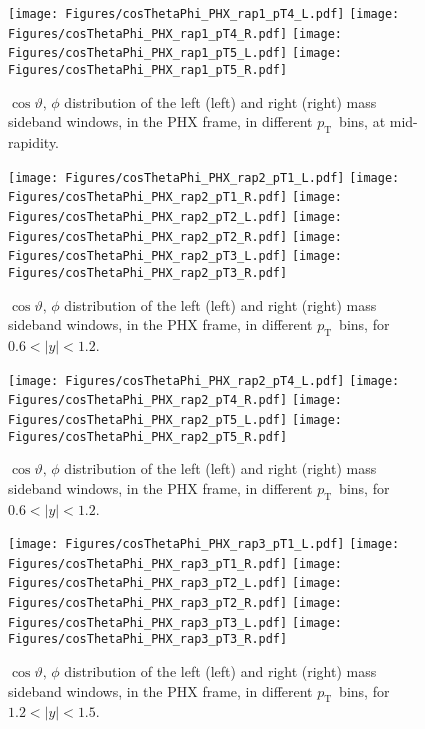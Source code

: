 \documentclass[12pt]{article}
\newcommand{\pt}{$p_{\mathrm{T}}$}
\begin{document}
\begin{figure}[htbp]
\centering
\texttt{[image: Figures/cosThetaPhi\_PHX\_rap1\_pT4\_L.pdf]}
\texttt{[image: Figures/cosThetaPhi\_PHX\_rap1\_pT4\_R.pdf]}
\texttt{[image: Figures/cosThetaPhi\_PHX\_rap1\_pT5\_L.pdf]}
\texttt{[image: Figures/cosThetaPhi\_PHX\_rap1\_pT5\_R.pdf]}
\caption{$\cos\vartheta,\,\phi$ distribution of the left (left) and
  right (right) mass sideband windows, in the PHX frame, in different
  \pt\ bins, at mid-rapidity.} 
\end{figure}
\clearpage


\begin{figure}[htbp]
\centering
\texttt{[image: Figures/cosThetaPhi\_PHX\_rap2\_pT1\_L.pdf]}
\texttt{[image: Figures/cosThetaPhi\_PHX\_rap2\_pT1\_R.pdf]}
\texttt{[image: Figures/cosThetaPhi\_PHX\_rap2\_pT2\_L.pdf]}
\texttt{[image: Figures/cosThetaPhi\_PHX\_rap2\_pT2\_R.pdf]}
\texttt{[image: Figures/cosThetaPhi\_PHX\_rap2\_pT3\_L.pdf]}
\texttt{[image: Figures/cosThetaPhi\_PHX\_rap2\_pT3\_R.pdf]}
\caption{$\cos\vartheta,\,\phi$ distribution of the left (left) and
  right (right) mass sideband windows, in the PHX frame, in different
  \pt\ bins, for $0.6 < |y| < 1.2$.}
\end{figure}
\clearpage

\begin{figure}[htbp]
\centering
\texttt{[image: Figures/cosThetaPhi\_PHX\_rap2\_pT4\_L.pdf]}
\texttt{[image: Figures/cosThetaPhi\_PHX\_rap2\_pT4\_R.pdf]}
\texttt{[image: Figures/cosThetaPhi\_PHX\_rap2\_pT5\_L.pdf]}
\texttt{[image: Figures/cosThetaPhi\_PHX\_rap2\_pT5\_R.pdf]}
\caption{$\cos\vartheta,\,\phi$ distribution of the left (left) and
  right (right) mass sideband windows, in the PHX frame, in different
  \pt\ bins, for $0.6 < |y| < 1.2$.} 
\end{figure}
\clearpage

\begin{figure}[htbp]
\centering
\texttt{[image: Figures/cosThetaPhi\_PHX\_rap3\_pT1\_L.pdf]}
\texttt{[image: Figures/cosThetaPhi\_PHX\_rap3\_pT1\_R.pdf]}
\texttt{[image: Figures/cosThetaPhi\_PHX\_rap3\_pT2\_L.pdf]}
\texttt{[image: Figures/cosThetaPhi\_PHX\_rap3\_pT2\_R.pdf]}
\texttt{[image: Figures/cosThetaPhi\_PHX\_rap3\_pT3\_L.pdf]}
\texttt{[image: Figures/cosThetaPhi\_PHX\_rap3\_pT3\_R.pdf]}
\caption{$\cos\vartheta,\,\phi$ distribution of the left (left) and
  right (right) mass sideband windows, in the PHX frame, in different
  \pt\ bins, for $1.2 < |y| < 1.5$.}
\end{figure}
\clearpage
\end{document}
